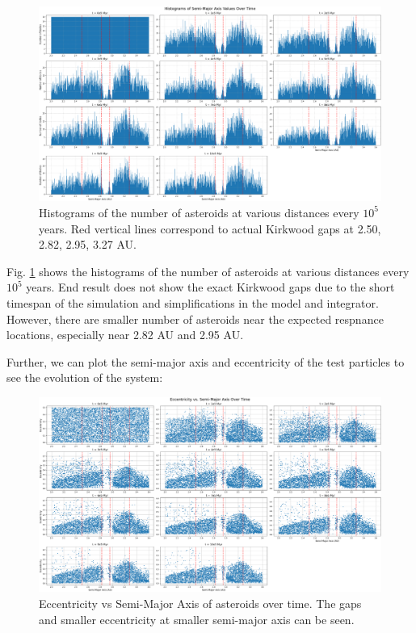\documentclass[12pt,a4paper]{article}
\begin{document}
\begin{figure}[ht]
  \centering
  \includegraphics[width=\linewidth]{kirkwood/hist_kirkwood.png}
  \caption{Histograms of the number of asteroids at various distances every $10^5$ years. Red vertical lines correspond to actual Kirkwood gaps at 2.50, 2.82, 2.95, 3.27 AU.}
  \label{fig:kirkwood_histogram}
\end{figure}

Fig. \ref{fig:kirkwood_histogram} shows the histograms of the number of asteroids at various distances every $10^5$ years.
End result does not show the exact Kirkwood gaps due to the short timespan of the simulation and simplifications in the model and integrator. However, there are smaller number of asteroids near the expected respnance locations, especially near 2.82 AU and 2.95 AU.

Further, we can plot the semi-major axis and eccentricity of the test particles to see the evolution of the system:

\begin{figure}[ht]
  \centering
  \includegraphics[width=\linewidth]{kirkwood/a_e_kirkwood.png}
  \caption{Eccentricity vs Semi-Major Axis of asteroids over time. The gaps and smaller eccentricity at smaller semi-major axis can be seen.}
  \label{fig:kirkwood_a_e}
\end{figure}
\end{document}
